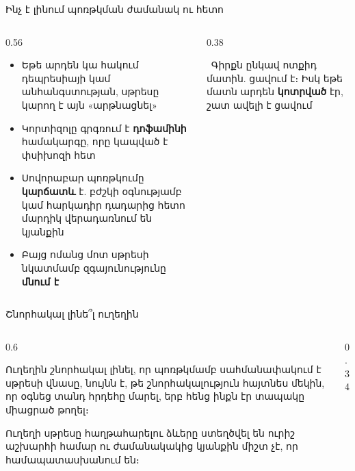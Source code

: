 \begin{frame}{Ինչ է լինում պոռթկման ժամանակ ու հետո}
  \begin{columns}[c]
    \begin{column}{0.56\textwidth}
      \begin{itemize}
        \item Եթե արդեն կա հակում դեպրեսիայի կամ անհանգստության, սթրեսը կարող է այն «արթնացնել»
        \item<2-> Կորտիզոլը գրգռում է \textbf{դոֆամինի} համակարգը, որը կապված է փսիխոզի հետ
        \item<3-> Սովորաբար պոռթկումը \textbf{կարճատև} է. բժշկի օգնությամբ կամ հարկադիր դադարից հետո մարդիկ վերադառնում են կյանքին
        \item<4-> Բայց ոմանց մոտ սթրեսի նկատմամբ զգայունությունը \textbf{մնում է}
      \end{itemize}
    \end{column}
    \begin{column}{0.38\textwidth}
      \begin{card}[colback=peach!35!cardwhite]
        \ Գիրքն ընկավ ոտքիդ մատին. ցավում է։ Իսկ եթե մատն արդեն \textbf{կոտրված} էր, շատ ավելի է ցավում
      \end{card}
    \end{column}
  \end{columns}
\end{frame}

\begin{frame}{Շնորհակալ լինե՞լ ուղեղին}
  \begin{columns}[c]
    \begin{column}{0.6\textwidth}
      \begin{bookquote}
        Ուղեղին շնորհակալ լինել, որ պոռթկմամբ սահմանափակում է սթրեսի վնասը, նույնն է, թե շնորհակալություն հայտնես մեկին, որ օգնեց տանդ հրդեհը մարել, երբ հենց ինքն էր տապակը միացրած թողել։
      \end{bookquote}
      \vspace{2mm}
      {\small Ուղեղի սթրեսը հաղթահարելու ձևերը ստեղծվել են ուրիշ աշխարհի համար ու ժամանակակից կյանքին միշտ չէ, որ համապատասխանում են։}
    \end{column}
    \begin{column}{0.34\textwidth}
      \centering{}\par
    \end{column}
  \end{columns}
\end{frame}

